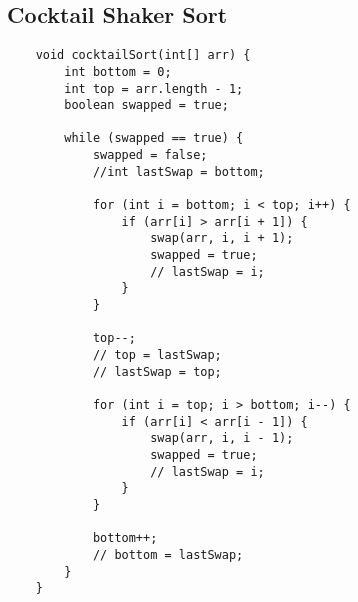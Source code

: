 \documentclass[simple-sorts.tex]{subfiles}
\begin{document}
    \subsection{Cocktail Shaker Sort}
    \begin{verbatim}
    void cocktailSort(int[] arr) {
        int bottom = 0;
        int top = arr.length - 1;
        boolean swapped = true;

        while (swapped == true) {
            swapped = false;
            //int lastSwap = bottom;

            for (int i = bottom; i < top; i++) {
                if (arr[i] > arr[i + 1]) {
                    swap(arr, i, i + 1);
                    swapped = true;
                    // lastSwap = i;
                }
            }

            top--;
            // top = lastSwap;
            // lastSwap = top;

            for (int i = top; i > bottom; i--) {
                if (arr[i] < arr[i - 1]) {
                    swap(arr, i, i - 1);
                    swapped = true;
                    // lastSwap = i;
                }
            }

            bottom++;
            // bottom = lastSwap;
        }
    }
    \end{verbatim}
\end{document}

